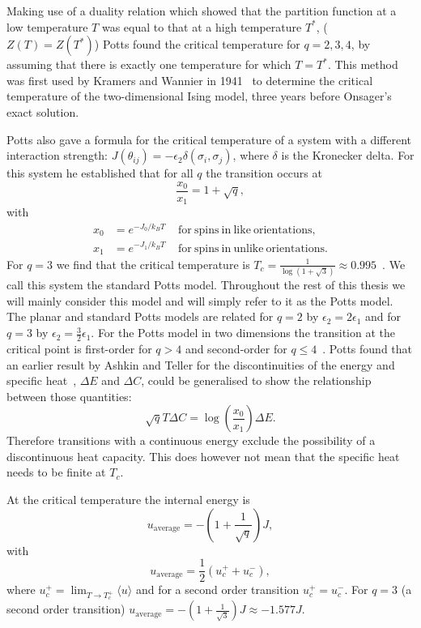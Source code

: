\documentclass[11pt, a4paper]{report} %
\begin{document}
Making use of a duality relation which showed that the partition function at a low temperature \(T\) was equal to that at a high temperature \(T^*\), (\(Z(T)=Z(T^*)\)) Potts found the critical temperature for \(q=2, 3, 4\), by assuming that there is exactly one temperature for which \(T=T^*\).
This method was first used by Kramers and Wannier in 1941~\cite{kramers:1941} to determine the critical temperature of the two-dimensional Ising model, three years before Onsager's exact solution.

Potts also gave a formula for the critical temperature of a system with a different interaction strength: \(J(\theta_{ij}) = -\epsilon_2 \delta(\sigma_i, \sigma_j)\), where \(\delta\) is the Kronecker delta.
For this system he established that for all \(q\) the transition occurs at~\cite{potts:1952}
\begin{equation}
	\frac{x_0}{x_1} = 1 + \sqrt{q},
\end{equation}
with
\begin{align}
	x_0 &= e^{-J_0 / k_B T} \mathrm{\ \ \ \ \ for\ spins\ in\ like\ orientations,}\\
	x_1 & = e^{-J_1 / k_B T} \mathrm{\ \ \ \ \ for\ spins\ in\ unlike\ orientations}.
\end{align}
For \(q=3\) we find that the critical temperature is \(T_c=\frac{1}{\log(1+\sqrt{3})} \approx 0.995\)~\cite{fan:2007}.
We call this system the standard Potts model.
Throughout the rest of this thesis we will mainly consider this model and will simply refer to it as the Potts model.
The planar and standard Potts models are related for \(q = 2\) by \(\epsilon_2 = 2 \epsilon_1\) and for \(q=3\) by \(\epsilon_2 = \frac{3}{2} \epsilon_1\).
For the Potts model in two dimensions the transition at the critical point is first-order for \(q > 4\) and second-order for \(q \leq 4\)~\cite{wu:1982,baxter:1973}.
Potts found that an earlier result by Ashkin and Teller for the discontinuities of the energy and specific heat~\cite{ashkin:1943}, \(\Delta E\) and \(\Delta C\), could be generalised to show the relationship between those quantities:
\begin{equation}
	\sqrt{q}T \Delta C = \log(\frac{x_0}{x_1}) \Delta E.
\end{equation}
Therefore transitions with a continuous energy exclude the possibility of a discontinuous heat capacity.
This does however not mean that the specific heat needs to be finite at \(T_c\).


At the critical temperature the internal energy is~\cite{baxter:1989,binder:1981a}
\begin{equation}
	u_{\mathrm{average}} = -\left(1+\frac{1}{\sqrt{q}}\right)J,
\end{equation}
with
\begin{equation}
	u_{\mathrm{average}} = \frac{1}{2} (u_c^+ + u_c^-),
\end{equation}
where \(u_c^+ = \lim_{T \to T_c^+} \langle u \rangle\) and for a second order transition \(u_c^+ = u_c^-\).
For \(q=3\) (a second order transition) \(u_{\mathrm{average}} = -(1+\frac{1}{\sqrt{3}})J \approx - 1.577 J\).
\end{document}
